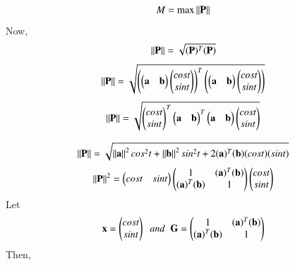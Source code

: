 \documentclass[journal]{IEEEtran}
\theoremstyle{remark}
\begin{document}
\begin{align}
   M=\text{max}\norm{\Vec{P}}
\end{align}
Now,
\begin{align}
    \norm{\Vec{P}}=\sqrt{(\Vec{P})^T(\Vec{P})}
\end{align}
\begin{align}
    \norm{\Vec{P}}=\sqrt{\brak{\myvec{\vec{a}&\vec{b}}\myvec{cost\\sint}}^T\brak{\myvec{\vec{a}&\vec{b}}\myvec{cost\\sint}}}
\end{align}
\begin{align}
    \norm{\Vec{P}}=\sqrt{\myvec{cost\\sint}^T\myvec{\vec{a}&\vec{b}}
    ^T\myvec{\vec{a}&\vec{b}}\myvec{cost\\sint}}
\end{align}

\begin{align}
   \norm{\Vec{P}}=\sqrt{\norm{\Vec{a}}^2cos^2t+ \norm{\Vec{b}}^2sin^2t+2(\Vec{a})^T(\Vec{b})(cost)(sint)}
\end{align}
\begin{align}
       \norm{\Vec{P}}^2=\myvec{cost & sint}\myvec{1&(\Vec{a})^T(\Vec{b})\\(\Vec{a})^T(\Vec{b})&1}\myvec{cost\\sint}
\end{align}
Let
\begin{align}
    \Vec{x}= \myvec{cost \\ sint} \;\;and\;\;\vec{G}=\myvec{1&(\Vec{a})^T(\Vec{b})\\(\Vec{a})^T(\Vec{b})&1}
\end{align}
Then, 
\end{document}
